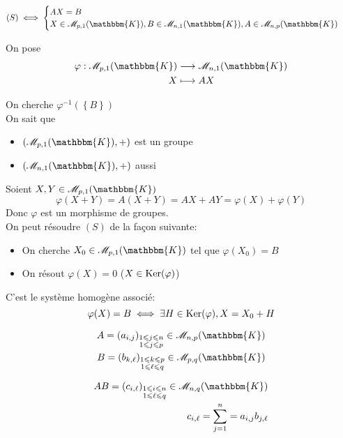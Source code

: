 \begin{rmk}
	\begin{align*}
		(S) &\iff \begin{cases}
			AX = B\\
			X \in \mathcal{M}_{p,1}(\mathbbm{K}), B \in \mathcal{M}_{n,1}(\mathbbm{K}), A \in \mathcal{M}_{n,p}(\mathbbm{K})
		\end{cases}
	\end{align*}

	On pose \begin{align*}
		\varphi: \mathcal{M}_{p,1}(\mathbbm{K}) &\longrightarrow \mathcal{M}_{n,1}(\mathbbm{K}) \\
		X &\longmapsto AX
	\end{align*}

	On cherche $\varphi^{-1} \left( \left\{ B \right\}  \right) $ \\

	On sait que
	\begin{itemize}
		\item $(\mathcal{M}_{p,1}(\mathbbm{K}), +)$ est un groupe
		\item $(\mathcal{M}_{n,1}(\mathbbm{K}), +)$ aussi
	\end{itemize}

	Soient $X, Y \in \mathcal{M}_{p,1}(\mathbbm{K})$ \[
		\varphi(X+Y) = A(X+Y) = AX + AY = \varphi(X) + \varphi(Y)
	\]Donc $\varphi$ est un morphisme de groupes.\\
	On peut résoudre $(S)$ de la façon suivante:
	\begin{itemize}
		\item On cherche $X_0 \in \mathcal{M}_{p,1}(\mathbbm{K})$ tel que $\varphi(X_0) = B$ 
		\item On résout $\varphi(X) = 0$ ($X \in \operatorname{Ker}(\varphi)$)
	\end{itemize}\vspace{5mm}

	C'est le système homogène associé: \[
		\varphi(X) = B \iff \exists H \in \operatorname{Ker}(\varphi), X = X_0+H
	\]
\end{rmk}

\begin{prop}
	\begin{align*}
		A = \left(a_{i,j}\right)_{\substack{1 \le j\le n\\1\le j\le p}} \in \mathcal{M}_{n,p}(\mathbbm{K})\\
		B = \left(b_{k,\ell}\right)_{\substack{1 \le k\le p\\1\le \ell\le q}} \in \mathcal{M}_{p,q}(\mathbbm{K})
	\end{align*}

	\begin{align*}
		AB = \left( c_{i,\ell} \right) _{\substack{1\le i\le n\\1\le \ell\le q}} \in \mathcal{M}_{n,q}(\mathbbm{K})\\
		c_{i,\ell} = \sum_{j = 1}^n = a_{i,j}b_{j,\ell}
	\end{align*}
\end{prop}

